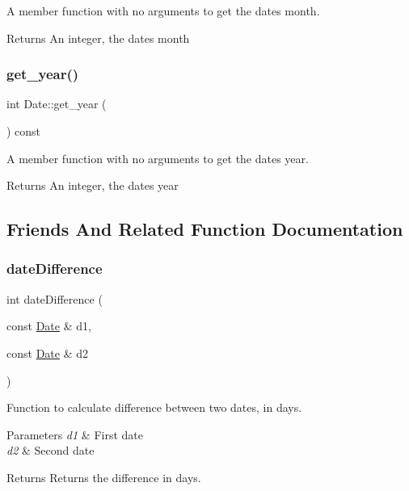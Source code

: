 A member function with no arguments to get the date\textquotesingle{}s month. \begin{DoxyReturn}{Returns}
An integer, the date\textquotesingle{}s month 
\end{DoxyReturn}
\hypertarget{class_date_a9e77e9f49890449fea9aeb8114da95ff}{}\label{class_date_a9e77e9f49890449fea9aeb8114da95ff} 
\subsubsection{\texorpdfstring{get\+\_\+year()}{get\_year()}}
{\footnotesize\ttfamily int Date\+::get\+\_\+year (\begin{DoxyParamCaption}{ }\end{DoxyParamCaption}) const}

A member function with no arguments to get the date\textquotesingle{}s year. \begin{DoxyReturn}{Returns}
An integer, the date\textquotesingle{}s year 
\end{DoxyReturn}


\subsection{Friends And Related Function Documentation}
\hypertarget{class_date_a90540af47999b64ed77651ece2ed3be5}{}\label{class_date_a90540af47999b64ed77651ece2ed3be5} 
\subsubsection{\texorpdfstring{date\+Difference}{dateDifference}}
{\footnotesize\ttfamily int date\+Difference (\begin{DoxyParamCaption}\item[{const \hyperlink{class_date}{Date} \&}]{d1,  }\item[{const \hyperlink{class_date}{Date} \&}]{d2 }\end{DoxyParamCaption})\hspace{0.3cm}{\ttfamily [friend]}}

Function to calculate difference between two dates, in days. 
\begin{DoxyParams}{Parameters}
{\em d1} & First date \\
\hline
{\em d2} & Second date \\
\hline
\end{DoxyParams}
\begin{DoxyReturn}{Returns}
Returns the difference in days. 
\end{DoxyReturn}
\hypertarget{class_date_a15180616122b6ffa419f17a06aca3ec7}{}\label{class_date_a15180616122b6ffa419f17a06aca3ec7} 
